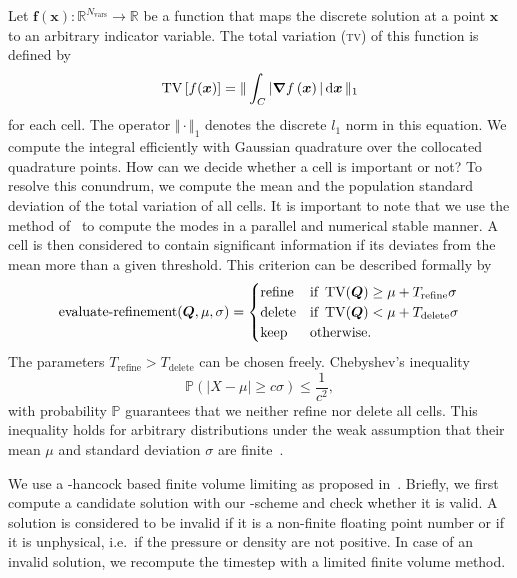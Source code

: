 \documentclass[runningheads]{llncs}
\begin{document}
Let $\bm{f}(\bm{x}): \mathbb{R}^{N_\text{vars}} \to \mathbb{R}$ be a function that maps the discrete solution at a point $\bm{x}$ to an arbitrary indicator variable.
The total variation (\textsc{tv}) of this function is defined by
\begin{equation}
  \label{eq:tv}
  \tv \left[ f(\bm{x}) \right] =
  \Vert
\intdcell{ \vert \gradient{f \left( \bm{x} \right)} \vert }
\Vert_1
\end{equation}
for each cell.
The operator $\Vert \cdot \Vert_1$ denotes the discrete $l_1$ norm in this equation.
We compute the integral efficiently with Gaussian quadrature over the collocated quadrature points.
\newcommand{\mean}{\mu}%
\newcommand{\std}{\sigma}%
\newcommand{\variance}{\std^2}%
\newcommand{\Trefine}{T_\text{refine}}%
\newcommand{\Tdelete}{T_\text{delete}}%
How can we decide whether a cell is important or not?
To resolve this conundrum, we compute the mean and the population standard deviation of the total variation of all cells.
It is important to note that we use the method of~\cite{chan1982updating} to compute the modes in a parallel and numerical stable manner.
A cell is then considered to contain significant information if its deviates from the mean more than a given threshold.
This criterion can be described formally by
\begin{equation}
  \label{eq:refinement-criterion}
  \operatorname{evaluate-refinement}(\Q, \mu, \sigma) =
  \begin{cases}
    \text{refine} & \text{if } \tv(\Q) \geq \mu + \Trefine \sigma \\
    \text{delete} & \text{if } \tv(\Q) < \mu + \Tdelete \sigma \\
    \text{keep} & \text{otherwise}.
    \end{cases}
\end{equation}
The parameters $\Trefine > \Tdelete$ can be chosen freely.
Chebyshev's inequality
\begin{equation}
  \label{eq:chebychev}
  \mathbb{P}(\vert X - \mu \vert \geq c \sigma) \leq \frac{1}{c^2},
\end{equation}
with probability $\mathbb{P}$ guarantees that we neither refine nor delete all cells. 
This inequality holds for arbitrary distributions under the weak assumption that their mean $\mu$ and standard deviation $\sigma$ are finite~\cite{wasserman2004all}.

We use a \muscl{}-hancock based finite volume limiting as proposed in~\cite{dumbser2016simple}.
Briefly, we first compute a candidate solution with our \aderdg{}-scheme and check whether it is valid.
A solution is considered to be invalid if it is a non-finite floating point number or if it is unphysical, i.e.\ if the pressure or density are not positive.
In case of an invalid solution, we recompute the timestep with a limited \muscl{} finite volume method.
\end{document}
